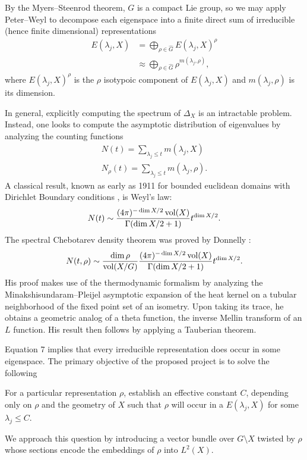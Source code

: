 \documentclass[11pt]{article}
\newcommand{\lmod}{\setminus}
\begin{document}
By the Myers--Steenrod theorem, $G$ is a compact Lie group, so we may apply Peter--Weyl to decompose each eigenspace into a finite direct sum of irreducible (hence finite dimensional) representations
\begin{align}E(\lambda_j,X)&= \bigoplus_{\rho \in \hat{G}} E(\lambda_j, X)^\rho\\
 &\approx \bigoplus_{\rho \in \hat{G}}\rho^{m(\lambda_j,\rho)},\end{align}
  where  $E(\lambda_j,X)^\rho$ is the $\rho$ isotypoic component of $E(\lambda_j,X)$ and $m(\lambda_j,\rho)$ is its dimension.
  
 In general, explicitly computing the spectrum of $\Delta_X$ is an intractable problem. Instead, one looks to compute the asymptotic distribution of eigenvalues by analyzing the counting functions 
 \begin{align}
	 N(t)=\sum_{\lambda_j\leq t} m(\lambda_j,X)\\
	 N_\rho(t)=\sum_{\lambda_j\leq t} m(\lambda_j,\rho).
	 \end{align}
A classical result, known as early as 1911 for bounded euclidean domains with Dirichlet Boundary conditions \cite{weyl1911}, is Weyl's law: 
\begin{align}
N(t)\sim \frac{(4\pi)^{-\dim X/2}\operatorname{vol}(X)}{\Gamma(\dim X/2+1)} t^{\dim X/2}.
\end{align}
The spectral Chebotarev density theorem was proved by Donnelly \cite{Donnelly1978}:  
\begin{align}
 N(t,\rho)\sim \frac{\dim \rho}{\operatorname{vol}(X/G)}\frac{(4\pi)^{-\dim X/2}\operatorname{vol}(X)}{\Gamma(\dim X/2+1)} t^{\dim X/2} \label{eq:1}.
\end{align}
His proof makes use of the thermodynamic formalism by analyzing the Minakshisundaram--Pleijel \cite{MP1949} asymptotic expansion of the heat kernel on a tubular neighborhood of the fixed point set of an isometry. Upon taking its trace, he obtains a geometric analog of a theta function, the inverse Mellin transform of an $L$ function. His result then follows by applying a Tauberian theorem.

Equation 7 implies that every irreducible representation does occur in some eigenspace. The primary objective of the proposed project is to solve the following 
\begin{problem}
	For a particular representation $\rho$, establish an effective constant $C$, depending only on $\rho$ and the geometry of $X$ such that $\rho$ will occur in a $E(\lambda_j,X)$ for some $\lambda_j\leq C$. 
\end{problem} We approach this question by introducing a vector bundle over $G\lmod X$ twisted by $\rho$ whose sections encode the embeddings of $\rho$ into $L^2(X)$. 
\end{document}
